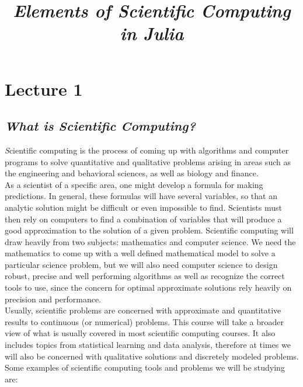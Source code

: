 \documentclass[11pt,a4paper,oneside]{report}
\begin{document}
\title{\it\huge Elements of Scientific Computing in Julia}
\maketitle

\tableofcontents
\newpage

\section*{Lecture 1}

{\center\color{magenta}
\subsection*{{\it\huge What is Scientific Computing?}}}

{\it\huge S}cientific computing is the process of coming up with algorithms and computer programs to solve quantitative and qualitative problems arising in areas such as the engineering and behavioral sciences, as well as biology and finance.\\

As a scientist of a specific area, one might develop a formula for making predictions. In general, these formulas will have several variables, so that an analytic solution might be difficult or even impossible to find. Scientists must then rely on computers to find a combination of variables that will produce a good approximation to the solution of a given problem. Scientific computing will draw heavily from two subjects: mathematics and computer science. We need the mathematics to come up with a well defined mathematical model to solve a particular science problem, but we will also need computer science to design robust, precise and well performing algorithms as well as recognize the correct tools to use, since the concern for optimal approximate solutions rely heavily on precision and performance.\\

Usually, scientific  problems are concerned with approximate and quantitative results to continuous (or numerical) problems. This course will take a broader view of what is usually covered in most scientific computing courses. It also includes topics from statistical learning and data analysis, therefore at times we will also be concerned with qualitative solutions and discretely modeled problems. Some examples of scientific computing tools and problems we will be studying are: \\
\end{document}
